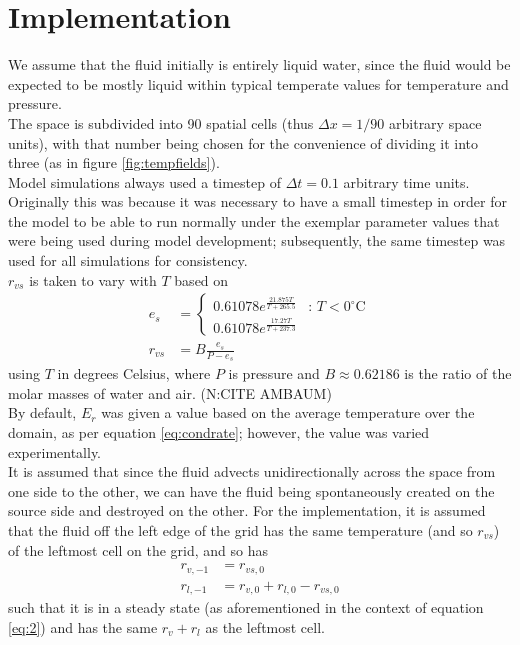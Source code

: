 \documentclass[11pt]{article}
\begin{document}
\section{Implementation}
We assume that the fluid initially is entirely liquid water, since the fluid would be expected to be mostly liquid within typical temperate values for temperature and pressure. \\
The space is subdivided into 90 spatial cells (thus $\Delta x=1/90$ arbitrary space units), with that number being chosen for the convenience of dividing it into three (as in figure \ref{fig:tempfields}). \\
Model simulations always used a timestep of $\Delta t=0.1$ arbitrary time units. Originally this was because it was necessary to have a small timestep in order for the model to be able to run normally under the exemplar parameter values that were being used during model development; subsequently, the same timestep was used for all simulations for consistency. \\
$r_{vs}$ is taken to vary with $T$ based on
\begin{align}
e_s &= \begin{cases}
0.61078 e^{\frac{21.875T}{T+265.5}} & \text{: $T<0^{\circ}$C} \\
0.61078 e^{\frac{17.27T}{T+237.3}} &
\end{cases} \label{eq:tetens} \\
r_{vs} &= B\frac{e_s}{P-e_s} \label{eq:magic}
\end{align}
using $T$ in degrees Celsius, where $P$ is pressure and $B\approx0.62186$ is the ratio of the molar masses of water and air. (N:CITE AMBAUM) \\
By default, $E_r$ was given a value based on the average temperature over the domain, as per equation \ref{eq:condrate}; however, the value was varied experimentally. \\
It is assumed that since the fluid advects unidirectionally across the space from one side to the other, we can have the fluid being spontaneously created on the source side and destroyed on the other. For the implementation, it is assumed that the fluid off the left edge of the grid has the same temperature (and so $r_{vs}$) of the leftmost cell on the grid, and so has
\begin{align}
r_{v,-1} &= r_{vs,0} \label{eq:a} \\
r_{l,-1} &= r_{v,0}+r_{l,0}-r_{vs,0} \label{eq:b}
\end{align}
such that it is in a steady state (as aforementioned in the context of equation \ref{eq:2}) and has the same $r_v+r_l$ as the leftmost cell. \\
\end{document}
